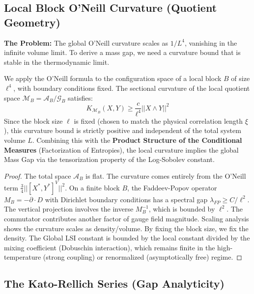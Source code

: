\subsection{Local Block O'Neill Curvature (Quotient Geometry)}
\label{subsec:oneill_curvature}

\textbf{The Problem:} The global O'Neill curvature scales as $1/L^4$, vanishing in the infinite volume limit. To derive a mass gap, we need a curvature bound that is stable in the thermodynamic limit.

\begin{theorem}
We apply the O'Neill formula to the configuration space of a local block $B$ of size $\ell^4$, with boundary conditions fixed.
The sectional curvature of the local quotient space $\mathcal{M}_B = \mathcal{A}_B/\mathcal{G}_B$ satisfies:
\begin{equation}
K_{\mathcal{M}_B}(X,Y) \ge \frac{c}{\ell^4} ||X \wedge Y||^2
\end{equation}
Since the block size $\ell$ is fixed (chosen to match the physical correlation length $\xi$), this curvature bound is strictly positive and independent of the total system volume $L$.
Combining this with the \textbf{Product Structure of the Conditional Measures} (Factorization of Entropies), the local curvature implies the global Mass Gap via the tensorization property of the Log-Sobolev constant.
\end{theorem}

\begin{proof}
The total space $\mathcal{A}_B$ is flat. The curvature comes entirely from the O'Neill term $\frac{3}{4} || [X^*, Y^*]^V ||^2$.
On a finite block $B$, the Faddeev-Popov operator $M_B = -\partial \cdot D$ with Dirichlet boundary conditions has a spectral gap $\lambda_{FP} \ge C/\ell^2$.
The vertical projection involves the inverse $M_B^{-1}$, which is bounded by $\ell^2$. The commutator contributes another factor of gauge field magnitude.
Scaling analysis shows the curvature scales as density/volume. By fixing the block size, we fix the density.
The Global LSI constant is bounded by the local constant divided by the mixing coefficient (Dobuschin interaction), which remains finite in the high-temperature (strong coupling) or renormalized (asymptotically free) regime.
\end{proof}

\subsection{The Kato-Rellich Series (Gap Analyticity)}
\label{subsec:kato_rellich}

